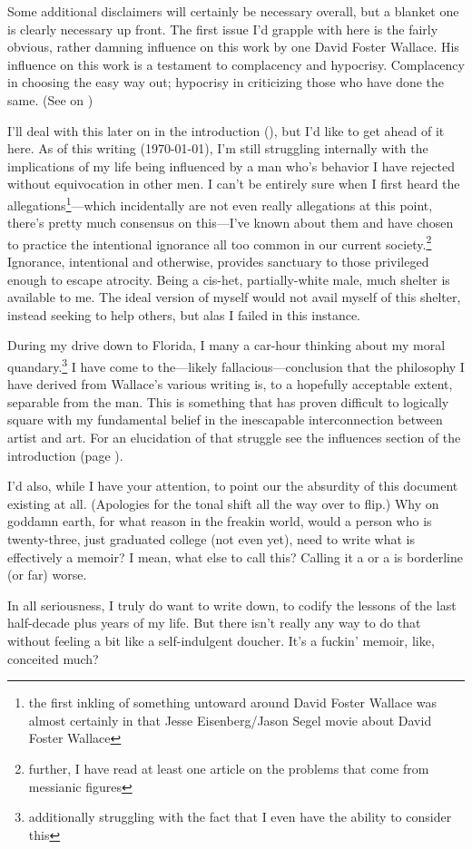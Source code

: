 \vspace*{\fill}
{\normalsize Some additional disclaimers will certainly be necessary overall, but a blanket one is clearly necessary up front.
The first issue I'd grapple with here is the fairly obvious, rather damning influence on this work by one David Foster Wallace.
His influence on this work is a testament to complacency and hypocrisy.
Complacency in choosing the easy way out; hypocrisy in criticizing those who have done the same.
(See  on )

I'll deal with this later on in the introduction (), but I'd like to get ahead of it here.
As of this writing (\today), I'm still struggling internally with the implications of my life being influenced by a man who's behavior I have rejected without equivocation in other men.
I can't be entirely sure when I first heard the allegations\footnote{the first inkling of something untoward around David Foster Wallace was almost certainly in that Jesse Eisenberg/Jason Segel movie about David Foster Wallace}---which incidentally are not even really allegations at this point, there's pretty much consensus on this---I've known about them and have chosen to practice the intentional ignorance all too common in our current society.\footnote{further, I have read at least one article on the problems that come from messianic figures\autocite{elonwallace}}
Ignorance, intentional and otherwise, provides sanctuary to those privileged enough to escape atrocity.
Being a cis-het, partially-white male, much shelter is available to me.
The ideal version of myself would not avail myself of this shelter, instead seeking to help others, but alas I failed in this instance.

During my drive down to Florida, I many a car-hour thinking about my moral quandary.\footnote{additionally struggling with the fact that I even have the ability to consider this}
I have come to the---likely fallacious---conclusion that the philosophy I have derived from Wallace's various writing is, to a hopefully acceptable extent, separable from the man.
This is something that has proven difficult to logically square with my fundamental belief in the inescapable interconnection between artist and art.
For an elucidation of that struggle see the influences section of the introduction (page \pageref{sec:influences}).

I'd also, while I have your attention, to point our the absurdity of this document existing at all.
(Apologies for the tonal shift all the way over to flip.)
Why on goddamn earth, for what reason in the freakin world, would a person who is twenty-three, just graduated college (not even yet), need to write what is effectively a memoir?
I mean, what else to call this?
Calling it a  or a  is borderline (or far) worse.

In all seriousness, I truly do want to write down, to codify the lessons of the last half-decade plus years of my life.
But there isn't really any way to do that without feeling a bit like a self-indulgent doucher.
It's a fuckin' memoir, like, conceited much?}

